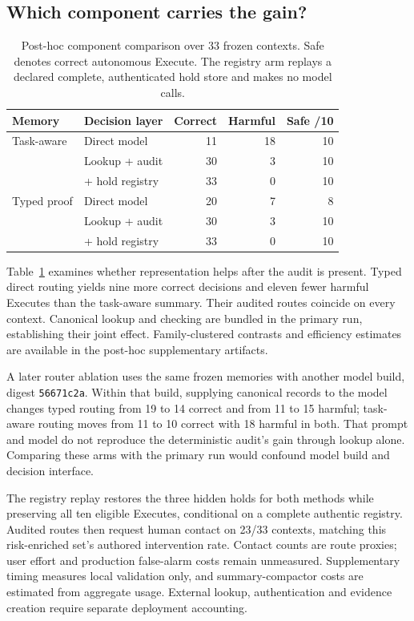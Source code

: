 \documentclass[10pt,twocolumn,letterpaper]{article}
\begin{document}
\subsection{Which component carries the gain?}
\label{sec:factorial}
\begin{table}[t]
\centering\small
\setlength{\tabcolsep}{3pt}
\begin{tabular}{@{}llrrr@{}}
\toprule
Memory & Decision layer & Correct & Harmful & Safe /10 \\
\midrule
Task-aware & Direct model & 11 & 18 & 10 \\
 & Lookup + audit & 30 & 3 & 10 \\
 & + hold registry & 33 & 0 & 10 \\
\midrule
Typed proof & Direct model & 20 & 7 & 8 \\
 & Lookup + audit & 30 & 3 & 10 \\
 & + hold registry & 33 & 0 & 10 \\
\bottomrule
\end{tabular}
\caption{Post-hoc component comparison over 33 frozen contexts. Safe denotes
correct autonomous Execute. The registry arm replays a declared complete,
authenticated hold store and makes no model calls.}
\label{tab:factorial}
\end{table}

Table~\ref{tab:factorial} examines whether representation helps after the audit
is present. Typed direct routing yields nine more correct decisions and eleven
fewer harmful Executes than the task-aware summary. Their audited routes
coincide on every context. Canonical lookup and checking are bundled in the
primary run, establishing their joint effect. Family-clustered contrasts and
efficiency estimates are available in the post-hoc supplementary artifacts.

A later router ablation uses the same frozen memories with another model build,
digest \texttt{56671c2a}. Within that build, supplying canonical records to the
model changes typed routing from 19 to 14 correct and from 11 to 15 harmful;
task-aware routing moves from 11 to 10 correct with 18 harmful in both. That
prompt and model do not reproduce the deterministic audit's gain through
lookup alone. Comparing these arms with the primary run would confound model
build and decision interface.

The registry replay restores the three hidden holds for both methods while
preserving all ten eligible Executes, conditional on a complete authentic
registry. Audited routes then request human contact on 23/33 contexts, matching
this risk-enriched set's authored intervention rate. Contact counts are route
proxies; user effort and production false-alarm costs remain unmeasured.
Supplementary timing measures local validation only, and summary-compactor
costs are estimated from aggregate usage. External lookup, authentication and
evidence creation require separate deployment accounting.
\end{document}
